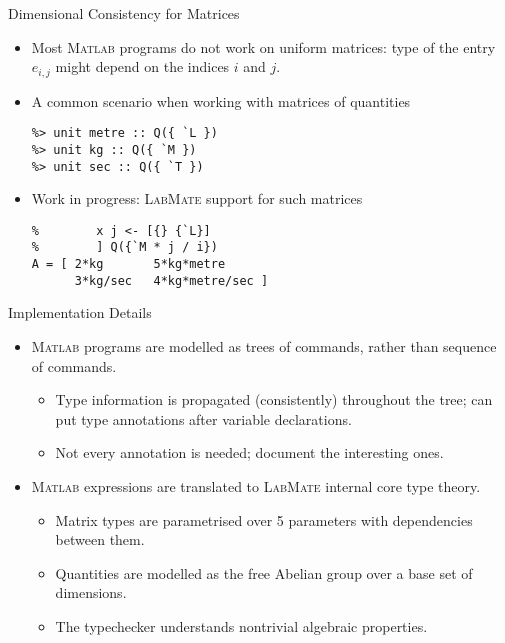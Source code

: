 \documentclass[]{beamer}
\newcommand{\tikzmark}[1]{\tikz[overlay,remember picture,baseline=-0.5ex] \node (#1) {};}
\newcommand{\lm}{\textsc{LabMate}\xspace}
\newcommand{\ma}{\textsc{Matlab}\xspace}
\begin{document}
\begin{frame}[fragile]{Dimensional Consistency for Matrices}
  \begin{itemize}[<+->]
  \item Most \ma programs do not work on uniform matrices: type of the entry $e_{i, j}$ might depend on the indices $i$ and $j$.
    \medskip
  \item A common scenario when working with matrices of quantities
\begin{lstlisting}[xleftmargin=0em]
%> dimensions V for Q over `L, `M, `T
%> unit metre :: Q({ `L })
%> unit kg :: Q({ `M })
%> unit sec :: Q({ `T })
\end{lstlisting}
\medskip
\item Work in progress: \lm support for such matrices
\begin{lstlisting}[xleftmargin=0em]
% > A :: [ i <- [{} {`T}]
%        x j <- [{} {`L}]
%        ] Q({`M * j / i})
A = [ 2*kg       5*kg*metre
      3*kg/sec   4*kg*metre/sec ]
\end{lstlisting}
  \end{itemize}
\end{frame}

\begin{frame}{Implementation Details}
  \begin{itemize}[<+->]
  \item \ma programs are modelled as trees of commands, rather than sequence of commands.
    \medskip
    \begin{itemize}
    \item Type information is propagated (consistently) throughout the tree; can put type annotations after variable declarations.
      \medskip
    \item Not every annotation is needed; document the interesting ones.
    \end{itemize}
    \medskip
  \item \ma expressions are translated to \lm internal core type theory.
    \medskip
    \begin{itemize}
    \item Matrix types are parametrised over 5 parameters with dependencies between them.
      \medskip
    \item Quantities are modelled as the free Abelian group over a base set of dimensions.
      \medskip
    \item The typechecker understands nontrivial algebraic properties.
    \end{itemize}
  \end{itemize}
\end{frame}
\end{document}
